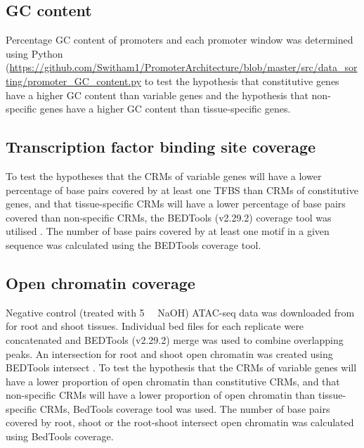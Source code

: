 \documentclass[../main.tex]{subfiles}
\begin{document}
\subsection{GC content}\label{chapter2:methods:gc-content}

Percentage GC content of promoters and each promoter window was determined using Python (\url{https://github.com/Switham1/PromoterArchitecture/blob/master/src/data_sorting/promoter_GC_content.py} to test the hypothesis that constitutive genes have a higher GC content than variable genes and the hypothesis that non\hyp{}specific genes have a higher GC content than tissue\hyp{}specific genes.


\subsection{Transcription factor binding site coverage}{\label{chapter2:methods:transcription-factor-binding-site-coverage}}

To test the hypotheses that the CRMs of variable genes will have a lower percentage of base pairs covered by at least one TFBS than CRMs of constitutive genes, and that tissue\hyp{}specific CRMs will have a lower percentage of base pairs covered than non\hyp{}specific CRMs, the BEDTools (v2.29.2) coverage tool was utilised \autocite{quinlanBEDToolsFlexibleSuite2010}.
The number of base pairs covered by at least one motif in a given sequence was calculated using the BEDTools coverage tool.

\subsection{Open chromatin coverage}\label{chapter2:methods:open-chromatin-coverage}
Negative control (treated with \SI{5}{\micro\Molar} NaOH) ATAC\hyp{}seq data was downloaded from \textcite{potterCytokininModulatesContextdependent2018} for root and shoot tissues.
Individual bed files for each replicate were concatenated and BEDTools (v2.29.2) merge \autocite{quinlanBEDToolsFlexibleSuite2010} was used to combine overlapping peaks.
An intersection for root and shoot open chromatin was created using BEDTools intersect \autocite{quinlanBEDToolsFlexibleSuite2010}.
To test the hypothesis that the CRMs of variable genes will have a lower proportion of open chromatin than constitutive CRMs, and that non\hyp{}specific CRMs will have a lower proportion of open chromatin than tissue\hyp{}specific CRMs, BedTools coverage tool \autocite{quinlanBEDToolsFlexibleSuite2010} was used.
The number of base pairs covered by root, shoot or the root\hyp{}shoot intersect open chromatin was calculated using BedTools coverage.
\end{document}
